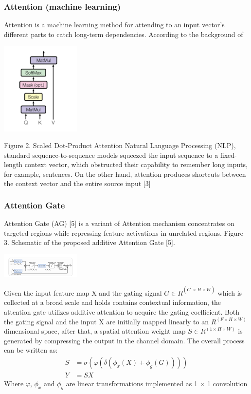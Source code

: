\documentclass[conference]{IEEEtran}
\begin{document}
\subsubsection{Attention (machine learning)}
Attention is a machine learning method for attending to an input vector’s different parts to catch long-term dependencies. According to the background of 
\centerline{\includegraphics[width=40mm,scale=0.5]{group/Picture3.png}}
Figure 2. Scaled Dot-Product Attention
Natural Language Processing (NLP), standard sequence-to-sequence models squeezed the input sequence to a fixed-length context vector, which obstructed their capability to remember long inputs, for example, sentences. On the other hand, attention produces shortcuts between the context vector and the entire source input [3]
\subsubsection{Attention Gate}
Attention Gate (AG) [5] is a variant of Attention mechanism concentrates on targeted regions while repressing feature activations in unrelated regions.
Figure 3. Schematic of the proposed additive Attention Gate [5].
\centerline{\includegraphics[width=40mm,scale=0.5]{group/Picture4.png}}
Given the input feature map X and the gating signal $G∈R^(C^'×H×W)$ which is collected at a broad scale and holds contains contextual information, the attention gate utilizes additive attention to acquire the gating coefficient. Both the gating signal and the input X are initially mapped linearly to an $R^(F×H×W)$ dimensional space, after that, a spatial attention weight map $S∈R^(1×H×W)$ is generated by compressing the output in the channel domain.
The overall process can be written as:
$$
\begin{aligned}
    S&=σ(φ(δ(ϕ_x (X)+ϕ_g (G))))\\
    Y&=SX
\end{aligned}
$$
Where $φ$, $ϕ_x$ and $ϕ_g$ are linear transformations implemented as 1 × 1 convolution
\end{document}
